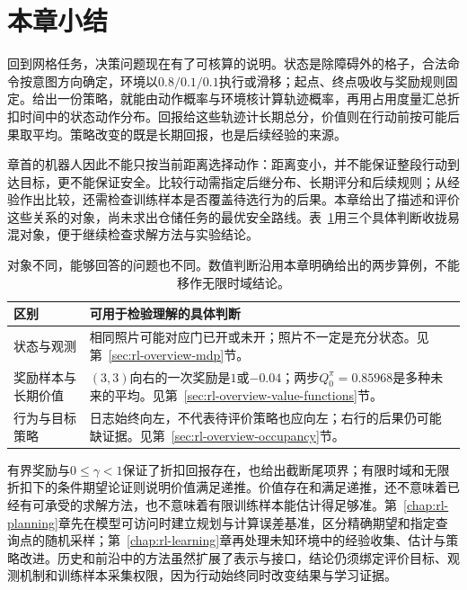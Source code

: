 \section{本章小结}
\label{sec:rl-overview-summary}

回到网格任务，决策问题现在有了可核算的说明。状态是除障碍外的格子，合法命令按意图方向确定，环境以$0.8/0.1/0.1$执行或滑移；起点、终点吸收与奖励规则固定。给出一份策略，就能由动作概率与环境核计算轨迹概率，再用占用度量汇总折扣时间中的状态动作分布。回报给这些轨迹计长期总分，价值则在行动前按可能后果取平均。策略改变的既是长期回报，也是后续经验的来源。

章首的机器人因此不能只按当前距离选择动作：距离变小，并不能保证整段行动到达目标，更不能保证安全。比较行动需指定后继分布、长期评分和后续规则；从经验作出比较，还需检查训练样本是否覆盖待选行为的后果。本章给出了描述和评价这些关系的对象，尚未求出仓储任务的最优安全路线。表~\ref{tab:rl-overview-distinctions}用三个具体判断收拢易混对象，便于继续检查求解方法与实验结论。

\begin{table}[htbp]
  \centering\small
  \begin{tabularx}{\linewidth}{@{}>{\raggedright\arraybackslash}p{31mm}>{\raggedright\arraybackslash}X@{}}
    \toprule
    区别 & 可用于检验理解的具体判断\\
    \midrule
    状态与观测 & 相同照片可能对应门已开或未开；照片不一定是充分状态。见第~\ref{sec:rl-overview-mdp}节。\\
    奖励样本与长期价值 & $(3,3)$向右的一次奖励是$1$或$-0.04$；两步$Q_0^\pi=0.85968$是多种未来的平均。见第~\ref{sec:rl-overview-value-functions}节。\\
    行为与目标策略 & 日志始终向左，不代表待评价策略也应向左；右行的后果仍可能缺证据。见第~\ref{sec:rl-overview-occupancy}节。\\
    \bottomrule
  \end{tabularx}
  \caption{对象不同，能够回答的问题也不同。数值判断沿用本章明确给出的两步算例，不能移作无限时域结论。}
  \label{tab:rl-overview-distinctions}
\end{table}

有界奖励与$0\leq\gamma<1$保证了折扣回报存在，也给出截断尾项界；有限时域和无限折扣下的条件期望论证则说明价值满足递推。价值存在和满足递推，还不意味着已经有可承受的求解方法，也不意味着有限训练样本能估计得足够准。第~\ref{chap:rl-planning}章先在模型可访问时建立规划与计算误差基准，区分精确期望和指定查询点的随机采样；第~\ref{chap:rl-learning}章再处理未知环境中的经验收集、估计与策略改进。历史和前沿中的方法虽然扩展了表示与接口，结论仍须绑定评价目标、观测机制和训练样本采集权限，因为行动始终同时改变结果与学习证据。
